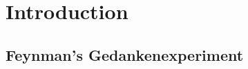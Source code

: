 \chapter{Introduction}\label{cha:introduction}




\section{Feynman's Gedankenexperiment}\label{sec:feynman-gedankenexperiment}

